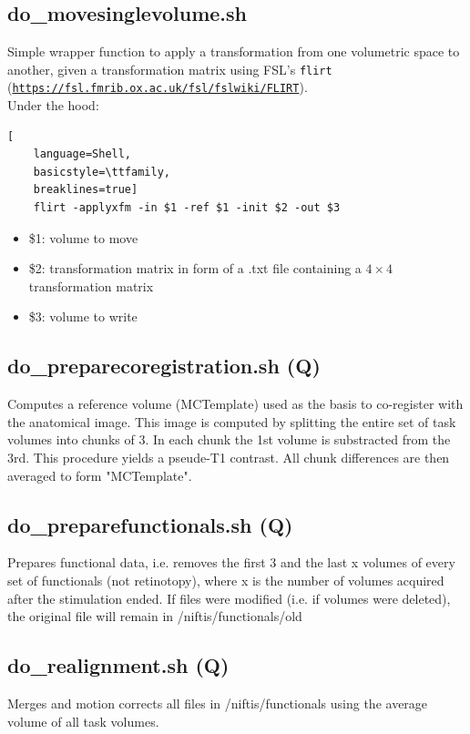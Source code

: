 \documentclass[12pt,a4paper]{scrartcl}
\begin{document}
\subsection{do\_movesinglevolume.sh}
\label{sh:move}
Simple wrapper function to apply a transformation from one volumetric space to another, given a transformation matrix using FSL's \texttt{flirt} (\href{https://fsl.fmrib.ox.ac.uk/fsl/fslwiki/FLIRT}{\nolinkurl{https://fsl.fmrib.ox.ac.uk/fsl/fslwiki/FLIRT}}).\\

\noindent Under the hood:
\begin{lstlisting}[
    language=Shell,
    basicstyle=\ttfamily,
    breaklines=true]
    flirt -applyxfm -in $1 -ref $1 -init $2 -out $3
\end{lstlisting}
\begin{itemize}
\item \$1: volume to move
\item \$2: transformation matrix in form of a .txt file containing a $4\times4$ transformation matrix
\item \$3: volume to write
\end{itemize}

\subsection{do\_preparecoregistration.sh (Q)}
\label{sh:prepcoreg}
Computes a reference volume (MCTemplate) used as the basis  to co-register with the anatomical image. This image is computed by splitting the entire set of task volumes into chunks of 3. In each chunk the 1st volume is substracted from the 3rd. This procedure yields a pseude-T1 contrast. All chunk differences are then averaged to form "MCTemplate".\\

\subsection{do\_preparefunctionals.sh (Q)}
\label{sh:prepfct}
Prepares functional data, i.e. removes the first 3 and the last x volumes of every set of functionals (not retinotopy), where x is the number of volumes acquired after the stimulation ended. If files were modified (i.e. if volumes were deleted), the original file will remain in /niftis/functionals/old\\

\subsection{do\_realignment.sh (Q)}
\label{sh:realign}
Merges and motion corrects all files in /niftis/functionals using the average volume of all task volumes.\\
\end{document}
